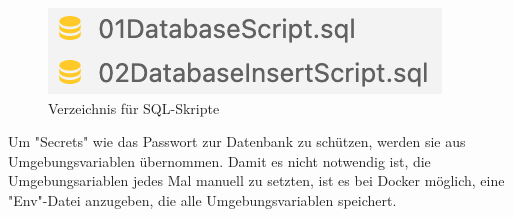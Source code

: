 \begin{figure}
    \centering
    \includegraphics{media/Docker/SQLScriptDir.png}
    \caption{Verzeichnis für SQL-Skripte}
    \label{fig:SQLScriptDir}
\end{figure}

Um "Secrets" wie das Passwort zur Datenbank zu schützen, werden sie aus Umgebungsvariablen übernommen.
Damit es nicht notwendig ist, die Umgebungsariablen jedes Mal manuell zu setzten, ist es bei Docker möglich, eine "Env"-Datei anzugeben, die alle Umgebungsvariablen speichert. 

